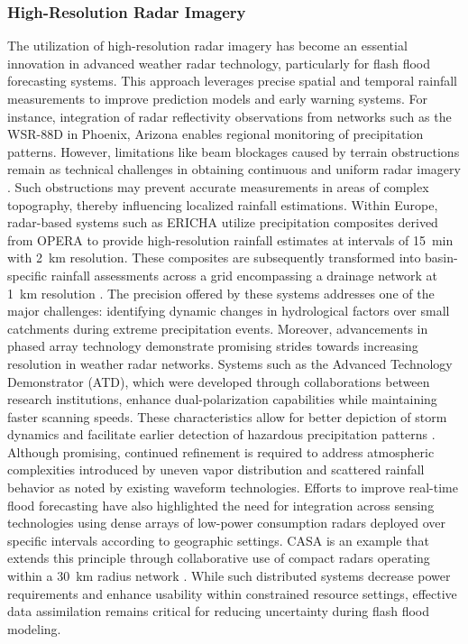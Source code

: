 \subsubsection{High-Resolution Radar Imagery}
The utilization of high-resolution radar imagery has become an essential innovation in advanced weather radar technology, particularly for flash flood forecasting systems. This approach leverages precise spatial and temporal rainfall measurements to improve prediction models and early warning systems. For instance, integration of radar reflectivity observations from networks such as the WSR-88D in Phoenix, Arizona enables regional monitoring of precipitation patterns. However, limitations like beam blockages caused by terrain obstructions remain as technical challenges in obtaining continuous and uniform radar imagery \citep{Yang2017}\citep{Wen2021}. Such obstructions may prevent accurate measurements in areas of complex topography, thereby influencing localized rainfall estimations.
Within Europe, radar-based systems such as ERICHA utilize precipitation composites derived from OPERA to provide high-resolution rainfall estimates at intervals of \SI{15}{\minute} with \SI{2}{\kilo\meter} resolution. These composites are subsequently transformed into basin-specific rainfall assessments across a grid encompassing a drainage network at \SI{1}{\kilo\meter} resolution \citep{Ritter2021b}\citep{Ritter2021a}. The precision offered by these systems addresses one of the major challenges: identifying dynamic changes in hydrological factors over small catchments during extreme precipitation events.
Moreover, advancements in phased array technology demonstrate promising strides towards increasing resolution in weather radar networks. Systems such as the Advanced Technology Demonstrator (ATD), which were developed through collaborations between research institutions, enhance dual-polarization capabilities while maintaining faster scanning speeds. These characteristics allow for better depiction of storm dynamics and facilitate earlier detection of hazardous precipitation patterns \citep{Wen2021}. Although promising, continued refinement is required to address atmospheric complexities introduced by uneven vapor distribution and scattered rainfall behavior as noted by existing waveform technologies.
Efforts to improve real-time flood forecasting have also highlighted the need for integration across sensing technologies using dense arrays of low-power consumption radars deployed over specific intervals according to geographic settings. CASA is an example that extends this principle through collaborative use of compact radars operating within a \SI{30}{\km} radius network \citep{Khan2020}. While such distributed systems decrease power requirements and enhance usability within constrained resource settings, effective data assimilation remains critical for reducing uncertainty during flash flood modeling.
